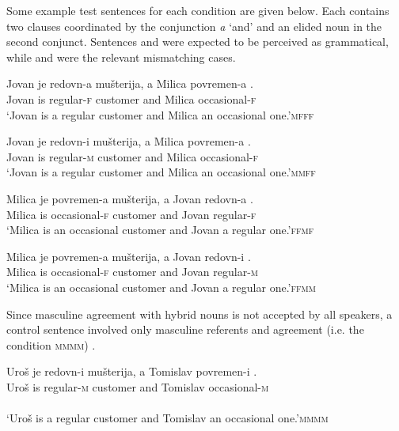 \documentclass[output=paper,
modfonts,
newtxmath,
hidelinks
]{langscibook}
\begin{document}
\noindent Some example test sentences for each condition are given below. Each contains two clauses coordinated by the conjunction \textit{a} `and' and an elided noun in the second conjunct. Sentences  and  were expected to be perceived as grammatical, while  and  were the relevant mismatching cases.
 
 
\ea \gll Jovan je redovn{-a} mušterija, a Milica povremen{-a} \underline{\hspace{1.5cm}}.\\
  		Jovan is regular{-\textsc{f}} customer and Milica occasional{-\textsc{f}}\\
  		\glt `Jovan is a regular customer and Milica an occasional one.'\hfill \textsc{mfff}\label{14:ex10}
        \z
  		
  		\ea \gll Jovan je redovn{-i} mušterija, a Milica povremen{-a} \underline{\hspace{1.5cm}}.\\
  		Jovan is regular{-\textsc{m}} customer and Milica occasional{-\textsc{f}}\\
  		\glt `Jovan is a regular customer and Milica an occasional one.'\hfill  \textsc{mmff}\label{14:ex11}
        \z
 
  		\ea \gll Milica je povremen{-a} mušterija, a Jovan redovn{-a} \underline{\hspace{1.5cm}}.\\
  		Milica is occasional{-\textsc{f}} customer and Jovan regular{-\textsc{f}}\\
  		\glt `Milica is an occasional customer and Jovan a regular one.'\hfill  \textsc{ffmf}\label{14:ex12}
        \z
  		
  		\ea \gll Milica je povremen{-a} mušterija, a Jovan redovn{-i} \underline{\hspace{1.5cm}}.\\
  		Milica is occasional{-\textsc{f}} customer and Jovan regular{-\textsc{m}}\\
  		\glt `Milica is an occasional customer and Jovan a regular one.'\hfill \textsc{ffmm}\label{14:ex13}
        \z
  		
\noindent Since masculine agreement with hybrid nouns is not accepted by all speakers, a control sentence involved only masculine referents and agreement (i.e. the condition \textsc{mmmm}) .

		\ea \gll Uroš je redovn{-i} mušterija, a Tomislav povremen{-i} \underline{\hspace{1.5cm}}.\\
  			Uroš is regular{-\textsc{m}} customer and Tomislav occasional{-\textsc{m}}\\ \\
  			\glt `Uroš is a regular customer and Tomislav an occasional one.'\hfill \textsc{mmmm}\label{14:ex14}
            \z
     
\end{document}
